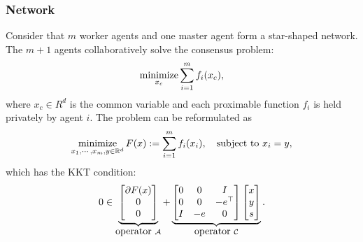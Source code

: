 \subsubsection{Network}\label{sec:network}
Consider that  $m$ worker agents and one master agent form a star-shaped network. The  $m+1$ agents collaboratively solve the consensus problem:  $$\operatorname*{minimize}_{x_c} \sum_{i=1}^m f_i(x_c),$$ where $x_c\in R^d$ is the common variable and each  proximable function $f_i$ is held privately by agent $i$. The problem can be reformulated as 
\begin{align}
\Min_{x_1,\cdots,x_m,y\in \RR^d} F(x) := \sum_{i=1}^mf_i(x_i),\quad \St~ x_i=y,   
\end{align}
{which has the  KKT condition}:
\begin{equation}\label{pro:decentral}
0\in\underbrace{
\begin{bmatrix}
\partial F(x)\\
0 \\
0
\end{bmatrix}}_{\mbox{operator}~\cA}+\underbrace{\begin{bmatrix}
0 & 0&I\\
0 & 0 & -e^\top \\
I & -e & 0
\end{bmatrix}\begin{bmatrix}
x\\
y\\
s
\end{bmatrix}}_{\mbox{operator}~\cC}.
\end{equation}

